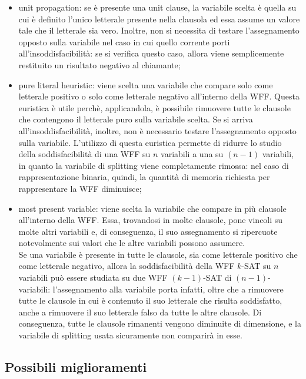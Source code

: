 \begin{itemize}
    \item unit propagation: se è presente una unit clause, la variabile scelta è quella su cui è definito l'unico letterale presente nella clausola ed essa assume un valore tale che il letterale sia vero.
    Inoltre, non si necessita di testare l'assegnamento opposto sulla variabile nel caso in cui quello corrente porti all'insoddisfacibilità: se si verifica questo caso, allora viene semplicemente restituito un risultato negativo al chiamante;
    \item pure literal heuristic: viene scelta una variabile che compare solo come letterale positivo o solo come letterale negativo all'interno della WFF.
    Questa euristica è utile perchè, applicandola, è possibile rimuovere tutte le clausole che contengono il letterale puro sulla variabile scelta.
    Se si arriva all'insoddisfacibilità, inoltre, non è necessario testare l'assegnamento opposto sulla variabile.
    L'utilizzo di questa euristica permette di ridurre lo studio della soddisfacibilità di una WFF su $n$ variabili a una su $(n-1)$ variabili, in quanto la variabile di splitting viene completamente rimossa: nel caso di rappresentazione binaria, quindi, la quantità di memoria richiesta per rappresentare la WFF diminuisce;
    \item most present variable: viene scelta la variabile che compare in più clausole all'interno della WFF. Essa, trovandosi in molte clausole, pone vincoli su molte altri variabili e, di conseguenza, il suo assegnamento si ripercuote notevolmente sui valori che le altre variabili possono assumere.\\
    Se una variabile è presente in tutte le clausole, sia come letterale positivo che come letterale negativo, allora la soddisfacibilità della WFF $k$-SAT su $n$ variabili può essere studiata su due WFF $(k-1)$-SAT di $(n-1)$-variabili: l'assegnamento alla variabile porta infatti, oltre che a rimuovere tutte le clausole in cui è contenuto il suo letterale che risulta soddisfatto, anche a rimuovere il suo letterale falso da tutte le altre clausole. Di conseguenza, tutte le clausole rimanenti vengono diminuite di dimensione, e la variabile di splitting usata sicuramente non comparirà in esse.
\end{itemize}

\subsection{Possibili miglioramenti}

